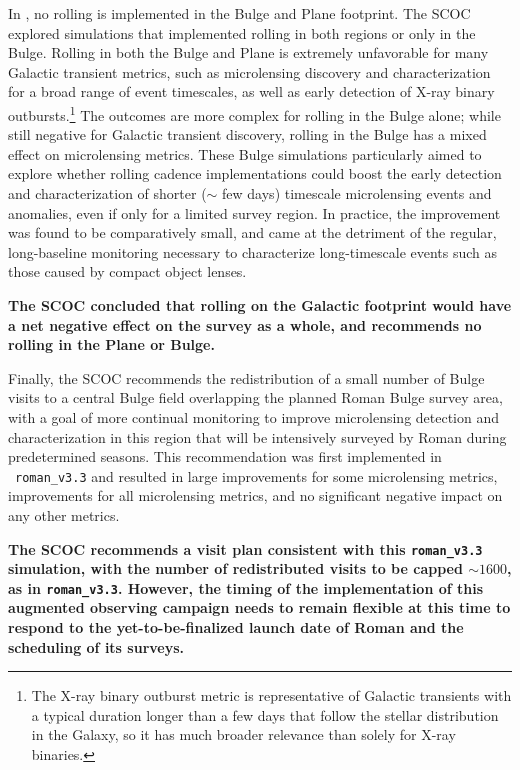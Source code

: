 In , no rolling is implemented in the Bulge and Plane footprint. The SCOC explored simulations that implemented rolling in both regions or only in the Bulge.
Rolling in both the Bulge and Plane is extremely unfavorable for many Galactic transient metrics, such as microlensing discovery and characterization for a broad range of event timescales, as well as early detection of X-ray binary outbursts.\footnote{The X-ray binary outburst metric is representative of Galactic transients with a typical duration longer than a few days that follow the stellar distribution in the Galaxy, so it has much broader relevance than solely for X-ray binaries.} The outcomes are more complex for rolling in the Bulge alone; while still negative for Galactic transient discovery, rolling in the Bulge has a mixed effect on microlensing metrics. These Bulge simulations particularly aimed to explore whether rolling cadence implementations could boost the early detection and characterization of shorter ($\sim$ few days) timescale microlensing events and anomalies, even if only for a limited survey region. In practice, the improvement was found to be comparatively small, and came at the detriment of the regular, long-baseline monitoring necessary to characterize long-timescale events such as those caused by compact object lenses.   


{\bf The SCOC concluded that rolling on the Galactic footprint would have a net negative effect on the survey as a whole, and recommends no rolling in the Plane or Bulge.}

Finally, the SCOC recommends the redistribution of a small number of Bulge visits to 
a central Bulge field overlapping the planned Roman Bulge survey area, with a goal of more continual monitoring to improve microlensing detection and characterization in this region that will be intensively surveyed by Roman during predetermined seasons.
This recommendation was first implemented in \opsim\ \texttt{roman\_v3.3} and resulted in large improvements for some microlensing metrics, improvements for all microlensing metrics, and no significant negative impact on any other metrics. 

{\bf The SCOC recommends a visit plan consistent with this \texttt{roman\_v3.3} simulation, with the number of redistributed visits to be capped $\sim1600$, as in  \texttt{roman\_v3.3}. However, the timing of the implementation of this augmented observing campaign needs to remain flexible at this time to respond to the yet-to-be-finalized launch date of Roman and the scheduling of its surveys.}


